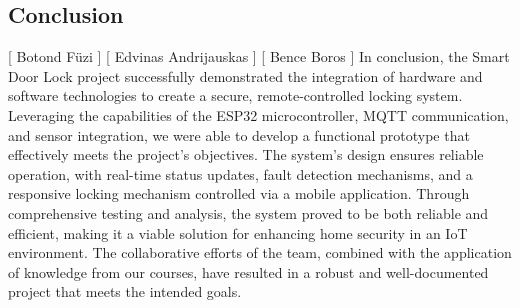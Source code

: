 \subsection{Conclusion}
[ Botond Füzi ] [ Edvinas Andrijauskas ] [ Bence Boros ] 
\newline
In conclusion, the Smart Door Lock project successfully demonstrated the integration of hardware and software technologies to create a secure, remote-controlled locking system. Leveraging the capabilities of the ESP32 microcontroller, MQTT communication, and sensor integration, we were able to develop a functional prototype that effectively meets the project's objectives. The system's design ensures reliable operation, with real-time status updates, fault detection mechanisms, and a responsive locking mechanism controlled via a mobile application. Through comprehensive testing and analysis, the system proved to be both reliable and efficient, making it a viable solution for enhancing home security in an IoT environment. The collaborative efforts of the team, combined with the application of knowledge from our courses, have resulted in a robust and well-documented project that meets the intended goals.
